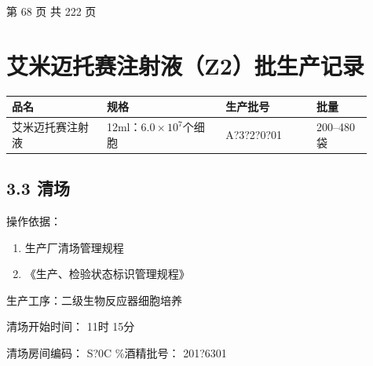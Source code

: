 \documentclass[UTF8,10pt,a4paper,fontset=fandol]{ctexart}
\newcommand{\fieldvalue}[1]{#1}
\newcommand{\handwritten}[1]{#1}
\begin{document}
\vfill

\begin{center}
第 68 页 共 222 页
\end{center}

\newpage

\section*{艾米迈托赛注射液（Z2）批生产记录}

\begin{center}
\begin{tabular}{|p{0.24\linewidth}|p{0.30\linewidth}|p{0.23\linewidth}|p{0.14\linewidth}|}
\hline
品名 & 规格 & 生产批号 & 批量 \\
\hline
艾米迈托赛注射液 &
12ml：$6.0\times 10^{7}$个细胞 &
\fieldvalue{\handwritten{A?3?2?0?01}} &
200--480袋 \\
\hline
\end{tabular}
\end{center}

\subsection*{3.3 清场}

操作依据：

\begin{enumerate}
\item 生产厂清场管理规程
\item 《生产、检验状态标识管理规程》
\end{enumerate}

生产工序：二级生物反应器细胞培养

清场开始时间：
\fieldvalue{\handwritten{11}}时
\fieldvalue{\handwritten{15}}分

清场房间编码：
\fieldvalue{\handwritten{S?0C}}
\%酒精批号：
\fieldvalue{\handwritten{201?6301}}
\end{document}

